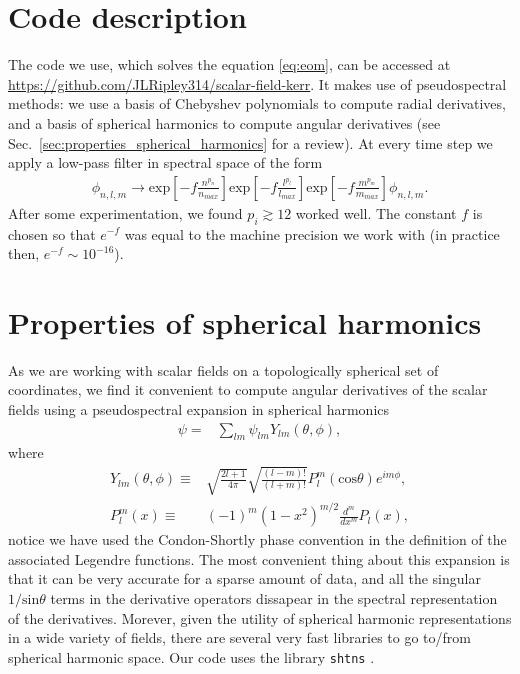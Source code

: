 \documentclass[%
 prd,
amsmath,amssymb,
preprint,%
]{revtex4-1}
\begin{document}
\section{\label{sec:code_description}
   Code description
   }
   The code we use, which solves the equation \eqref{eq:eom},
   can be accessed at 
   \url{https://github.com/JLRipley314/scalar-field-kerr}.
   It makes use of pseudospectral methods: we use a 
   basis of Chebyshev polynomials to compute radial derivatives,
   and a basis of spherical harmonics to compute angular derivatives 
   (see Sec.~\ref{sec:properties_spherical_harmonics} for a review).
   At every time step we apply a low-pass filter in spectral space of the form
   \begin{align}
      \phi_{n,l,m}
      \to
      \mathrm{exp}\left[-f\frac{n^{p_n}}{n_{max}}\right]
      \mathrm{exp}\left[-f\frac{l^{p_l}}{l_{max}}\right]
      \mathrm{exp}\left[-f\frac{m^{p_m}}{m_{max}}\right]
      \phi_{n,l,m}
      .
   \end{align}
   After some experimentation, we found $p_i\gtrsim12$ worked well.
   The constant $f$ is chosen so that $e^{-f}$ was equal to the machine
   precision we work with (in practice then, $e^{-f}\sim 10^{-16}$).
\section{\label{sec:properties_spherical_harmonics}
   Properties of spherical harmonics
   }
As we are working with scalar fields on a topologically spherical set
of coordinates, we find it convenient to compute angular derivatives
of the scalar fields using a pseudospectral expansion
in spherical harmonics
\begin{align}
   \psi
   =&
   \sum_{lm} \psi_{lm}Y_{lm}\left(\theta,\phi\right)
   ,
\end{align}
where
\begin{align}
   Y_{lm}\left(\theta,\phi\right)
   \equiv&
   \sqrt{
      \frac{2l+1}{4\pi}
   }
   \sqrt{
      \frac{(l-m)!}{(l+m)!}
   }
   P^m_l\left(\mathrm{cos}\theta\right)
   e^{im\phi}
   ,\\
   P^m_l\left(x\right)
   \equiv&
   \left(-1\right)^m
   \left(1-x^2\right)^{m/2}\frac{d^m}{dx^m}P_l\left(x\right)
   ,
\end{align}
notice we have used the Condon-Shortly phase convention in the
definition of the associated Legendre functions.
The most convenient thing about this expansion is that it can be
very accurate for a sparse amount of data, and all the singular
$1/\mathrm{sin}\theta$ terms in the derivative operators
dissapear in the spectral representation of the derivatives.
Morever, given the utility of spherical harmonic representations in a 
wide variety of fields, there are several very fast libraries to 
go to/from spherical harmonic space.
Our code uses the library \texttt{shtns} \cite{2013GGG....14..751S}.
\end{document}

